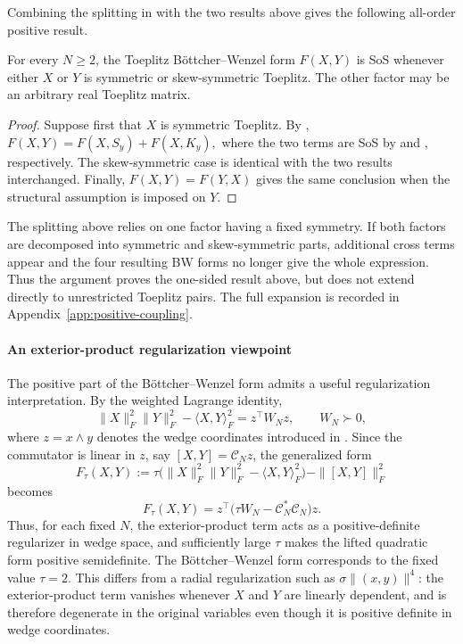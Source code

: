 Combining the splitting in  with the two
results above gives the following all-order positive result.

\begin{theorem}
\label{thm:one-sided}
For every $N\ge2$, the Toeplitz B\"ottcher--Wenzel form $F(X,Y)$ is SoS
whenever either $X$ or $Y$ is symmetric or skew-symmetric Toeplitz.
The other factor may be an arbitrary real Toeplitz matrix.
\end{theorem}

\begin{proof}
Suppose first that $X$ is symmetric Toeplitz.  By
,
$
 F(X,Y)=F(X,S_y)+F(X,K_y),
$
where the two terms are SoS by  and
, respectively.  The skew-symmetric case is
identical with the two results interchanged.  Finally,
$F(X,Y)=F(Y,X)$ gives the same conclusion when the structural
assumption is imposed on $Y$.
\end{proof}

\begin{remark}
The splitting above relies on one factor having a fixed symmetry.  If
both factors are decomposed into symmetric and skew-symmetric parts,
additional cross terms appear and the four resulting BW forms no longer
give the whole expression.  Thus the argument proves the one-sided
result above, but does not extend directly to unrestricted Toeplitz
pairs.  The full expansion is recorded in
Appendix~\ref{app:positive-coupling}.
\end{remark}

\paragraph{An exterior-product regularization viewpoint}
The positive part of the B\"ottcher--Wenzel form admits a useful
regularization interpretation.  By the weighted Lagrange identity,
\[
 \|X\|_F^2\|Y\|_F^2-\langle X,Y\rangle_F^2
 =
 z^\top W_Nz,
 \qquad W_N\succ0,
\]
where $z=x\wedge y$ denotes the wedge coordinates introduced in
.  Since the commutator is linear in
$z$, say $[X,Y]=\mathscr C_Nz$, the generalized form
\[
 F_\tau(X,Y)
 :=
 \tau\bigl(
 \|X\|_F^2\|Y\|_F^2-\langle X,Y\rangle_F^2
 \bigr)
 -
 \|[X,Y]\|_F^2
\]
becomes
\[
 F_\tau(X,Y)
 =
 z^\top
 \bigl(\tau W_N-\mathscr C_N^*\mathscr C_N\bigr)z.
\]
Thus, for each fixed $N$, the exterior-product term acts as a
positive-definite regularizer in wedge space, and sufficiently large
$\tau$ makes the lifted quadratic form positive semidefinite.
The B\"ottcher--Wenzel form corresponds to the fixed value $\tau=2$. 
This differs from a radial regularization such as
$\sigma\|(x,y)\|^4$: the exterior-product term vanishes whenever
$X$ and $Y$ are linearly dependent, and is therefore degenerate in
the original variables even though it is positive definite in wedge
coordinates.
